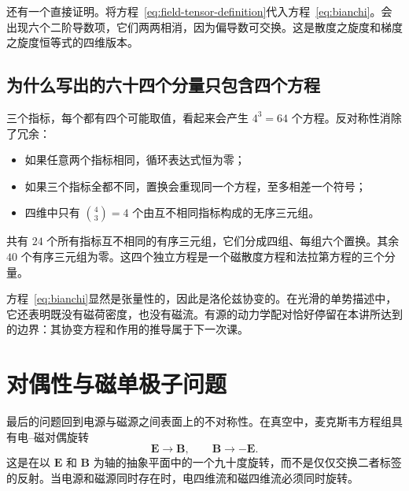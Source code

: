 还有一个直接证明。将方程~\eqref{eq:field-tensor-definition}代入方程~\eqref{eq:bianchi}。会出现六个二阶导数项，它们两两相消，因为偏导数可交换。这是散度之旋度和梯度之旋度恒等式的四维版本。

\begin{classroomqa}
\end{classroomqa}

\subsection{为什么写出的六十四个分量只包含四个方程}

三个指标，每个都有四个可能取值，看起来会产生
\(4^3=64\) 个方程。反对称性消除了冗余：
\begin{itemize}
\item 如果任意两个指标相同，循环表达式恒为零；
\item 如果三个指标全都不同，置换会重现同一个方程，至多相差一个符号；
\item 四维中只有
\(\binom{4}{3}=4\) 个由互不相同指标构成的无序三元组。
\end{itemize}
共有 \(24\) 个所有指标互不相同的有序三元组，它们分成四组、每组六个置换。其余 \(40\) 个有序三元组为零。这四个独立方程是一个磁散度方程和法拉第方程的三个分量。

\begin{classroomqa}
\end{classroomqa}

方程~\eqref{eq:bianchi}显然是张量性的，因此是洛伦兹协变的。在光滑的单势描述中，它还表明既没有磁荷密度，也没有磁流。有源的动力学配对恰好停留在本讲所达到的边界：其协变方程和作用的推导属于下一次课。

\section{对偶性与磁单极子问题}

最后的问题回到电源与磁源之间表面上的不对称性。在真空中，麦克斯韦方程组具有电--磁对偶旋转
\begin{equation}
\mathbf E\longrightarrow\mathbf B,
\qquad
\mathbf B\longrightarrow-\mathbf E.
\label{eq:duality-quarter-turn}
\end{equation}
这是在以 \(\mathbf E\) 和 \(\mathbf B\) 为轴的抽象平面中的一个九十度旋转，而不是仅仅交换二者标签的反射。当电源和磁源同时存在时，电四维流和磁四维流必须同时旋转。

